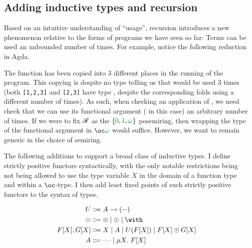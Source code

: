 \begin{mathpar}
\end{mathpar}

\subsection{Adding inductive types and recursion}\label{sec:rec}

Based on an intuitive understanding of ``usage'', recursion introduces a new
phenomenon relative to the forms of programs we have seen so far:
Terms can be used an unbounded number of times.
For example, notice the following reduction in Agda.


The function \AgdaFunction{\_+\_} has been copied into 3 different places in
the running of the program.
This copying is despite no type telling us that \AgdaFunction{\_+\_} would be
used 3 times (both \verb|[1,2,3]| and \verb|[2,3]| have type
\AgdaSpace{}, despite the
corresponding folds using \AgdaFunction{\_+\_} a different number of times).
As such, when checking an application of , we need check
that we can use its functional argument (\AgdaFunction{\_+\_} in this case) an
arbitrary number of times.
If we were to fix $\Ann$ as the $\{\gr0, \gr1, \gr\omega\}$ posemiring, then
wrapping the type of the functional argument in $\oc\gr\omega$ would suffice.
However, we want to remain generic in the choice of semiring.

The following additions to \name{} support a broad class of
inductive types.
I define strictly positive functors syntactically, with the only notable
restrictions being not being allowed to use the type variable $X$ in the domain
of a function type and within a $\oc$-type.
I then add least fixed points of such strictly positive functors to the syntax
of types.

\begin{align*}
  U &\Coloneqq A \multimap (-) \\
  {\odot} &\Coloneqq {\otimes} \mid {\oplus} \mid {\with} \\
  F[X], G[X] &\Coloneqq X \mid A \mid U(F[X]) \mid F[X] \odot G[X] \\
  A &\Coloneqq \cdots \mid \mu X.~F[X]
\end{align*}

